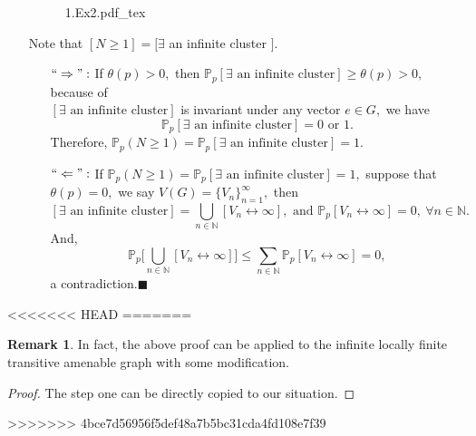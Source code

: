 \documentclass[12pt,a4paper]{report}
\theoremstyle{definition}
\newtheorem*{remark}{Remark}
\newcommand{\SOL}{\fbox{ \tt s\parbox[b][2pt][c]{6pt}{o}\hspace*{-7pt} L:}}
\newcommand{\incfig}[1]{%
{#1.pdf_tex}
}
\begin{document}
\begin{enumerate}
\begin{figure}[htp]
	\centering
	\def\svgwidth{8cm}
	\incfig{1.Ex2}
	\end{figure}
	\item[\SOL] Note that $[N\geq 1]=[\exists$ an infinite cluster $].$
	\begin{enumerate}
	    \item[$``\Rightarrow":$] If $\theta(p)>0,$ then $\mathbb{P}_p[\exists\mbox{ an infinite cluster}]\geq\theta(p)>0,$ because of\\ $[\exists\mbox{ an infinite cluster}]$ is invariant under any vector $e\in G,$ we have
	    \[
	   \mathbb{P}_p[\exists\mbox{ an infinite cluster}]=0\mbox{ or }1.
	    \]
	    Therefore, $\mathbb{P}_p(N\geq 1)=\mathbb{P}_p[\exists\mbox{ an infinite cluster}]=1.$
	    \item[$``\Leftarrow":$] If $\mathbb{P}_p(N\geq 1)=\mathbb{P}_p[\exists\mbox{ an infinite cluster}]=1,$ suppose that $\theta(p)=0,$ we say $V(G)=\{V_n\}_{n=1}^\infty,$ then
	    \[
	    [\exists\mbox{ an infinite cluster}]=\bigcup_{n\in\mathbb{N}}[V_n\leftrightarrow\infty],\mbox{ and } \mathbb{P}_p[V_n\leftrightarrow\infty]=0,\ \forall n\in\mathbb{N}.
	    \]
	    And,
	    \[
	    \mathbb{P}_p\Big[\bigcup_{n\in\mathbb{N}}[V_n\leftrightarrow\infty]\Big]\leq \sum_{n\in\mathbb{N}}\mathbb{P}_p[V_n\leftrightarrow\infty]=0,
	    \]
	    a contradiction.\qquad $\blacksquare$
	\end{enumerate}
\end{enumerate}
<<<<<<< HEAD
=======
\begin{remark}
In fact, the above proof can be applied to the infinite locally finite transitive amenable graph with some modification.
\end{remark}
\begin{proof}
The step one can be directly copied to our situation.
\end{proof}
>>>>>>> 4bce7d56956f5def48a7b5bc31cda4fd108e7f39
\newpage
\end{document}
